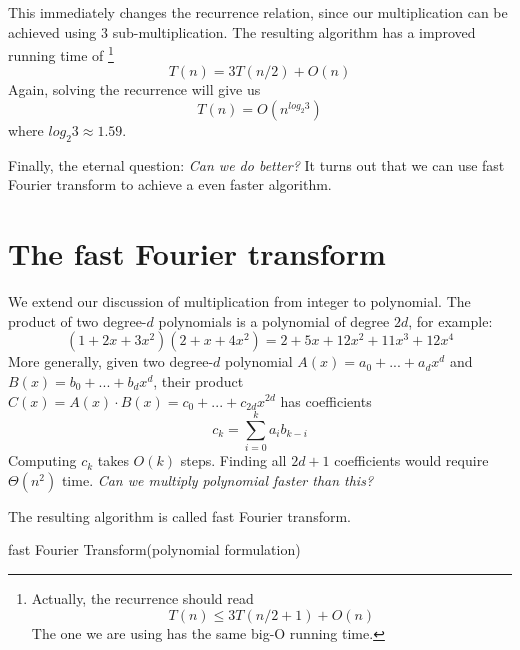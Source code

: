\documentclass[12pt,a4paper]{amsart}
\numberwithin{equation}{section}
\theoremstyle{plain}
\theoremstyle{definition}
\begin{document}
This immediately changes the recurrence relation, since our multiplication can be achieved using
3 sub-multiplication. The resulting algorithm has a improved running time of
\footnote{Actually, the recurrence should read $$T(n) \leq 3T(n/2 + 1) + O(n) $$ The one we are using has the same big-O running time.}
$$ T(n) = 3T(n/2) + O(n) $$
Again, solving the recurrence will give us
$$ T(n) = O(n^{log_2 3})$$
where $log_2 3 \approx 1.59$.

Finally, the eternal question: \emph{Can we do better?} It turns out that we can use fast
Fourier transform to achieve a even faster algorithm.

\section{The fast Fourier transform}
We extend our discussion of multiplication from integer to polynomial. The product of two degree-$d$ polynomials is a polynomial of degree $2d$,
for example:
$$(1 + 2x + 3x^2)(2 + x + 4x^2) = 2 + 5x + 12x^2 + 11x^3 + 12x^4$$
More generally, given two degree-$d$ polynomial $A(x) = a_0 + ... + a_d x^d$ and
$B(x) = b_0 + ... + b_d x^d$, their product $C(x) = A(x) \cdot B(x) = c_0 + ... + c_{2d} x^{2d}$ has coefficients
$$ c_k = \sum_{i = 0}^{k} a_i b_{k -i} $$
Computing $c_k$ takes $O(k)$ steps. Finding all $2d + 1$ coefficients would require $\Theta(n^2)$ time. \emph{Can we multiply polynomial faster than this?}

The resulting algorithm is called fast Fourier transform. \\

\begin{algorithm}[H]
    \SetAlgoLined
    \label{FFT}
    \caption{fast Fourier Transform(polynomial formulation)\cite{cormen}}
\end{algorithm}
\end{document}
